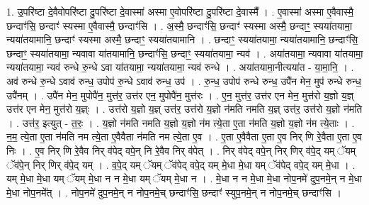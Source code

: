 \documentclass[17pt]{extarticle}
\begin{document}
1. उ॒परि॑ष्टा दे॒वैवोपरि॑ष्टा दु॒परि॑ष्टा दे॒वास्मा॑ अस्मा ए॒वोपरि॑ष्टा दु॒परि॑ष्टा दे॒वास्मै᳚ । . ए॒वास्मा॑ अस्मा ए॒वैवास्मै॒ छन्दाꣳ॑सि॒ छन्दाꣳ॑ स्यस्मा ए॒वैवास्मै॒ छन्दाꣳ॑सि । . अ॒स्मै॒ छन्दाꣳ॑सि॒ छन्दाꣳ॑ स्यस्मा अस्मै॒ छन्दाꣳ॒॒ स्यया॑तयामा॒ न्यया॑तयामानि॒ छन्दाꣳ॑
स्यस्मा अस्मै॒ छन्दाꣳ॒॒ स्यया॑तयामानि । . छन्दाꣳ॒॒ स्यया॑तयामा॒ न्यया॑तयामानि॒ छन्दाꣳ॑सि॒ छन्दाꣳ॒॒ स्यया॑तयामा॒ न्यवावा या॑तयामानि॒ छन्दाꣳ॑सि॒ छन्दाꣳ॒॒ स्यया॑तयामा॒ न्यव॑ । . अया॑तयामा॒ न्यवावा या॑तयामा॒ न्यया॑तयामा॒ न्यव॑ रुन्धे रु॒न्धे ऽवा या॑तयामा॒ न्यया॑तयामा॒ न्यव॑ रुन्धे । . अया॑तयामा॒नीत्यया॑त - या॒मा॒नि॒ । . अव॑ रुन्धे रु॒न्धे ऽवाव॑ रुन्ध॒ उपोप॑ रु॒न्धे ऽवाव॑ रुन्ध॒ उप॑ । . रु॒न्ध॒ उपोप॑ रुन्धे रुन्ध॒ उपै॑न मेन॒ मुप॑ रुन्धे रुन्ध॒ उपै॑नम् । . उपै॑न मेन॒ मुपोपै॑न॒ मुत्त॑र॒ उत्त॑र एन॒ मुपोपै॑न॒ मुत्त॑रः । . ए॒न॒ मुत्त॑र॒ उत्त॑र एन मेन॒ मुत्त॑रो य॒ज्ञो य॒ज्ञ् उत्त॑र एन मेन॒ मुत्त॑रो य॒ज्ञ्ः । . उत्त॑रो य॒ज्ञो य॒ज्ञ् उत्त॑र॒ उत्त॑रो य॒ज्ञो न॑मति नमति य॒ज्ञ् उत्त॑र॒ उत्त॑रो य॒ज्ञो न॑मति । . उत्त॑र॒ इत्युत् - त॒रः॒ । . य॒ज्ञो न॑मति नमति य॒ज्ञो य॒ज्ञो न॑म त्ये॒ता ए॒ता न॑मति य॒ज्ञो य॒ज्ञो न॑म त्ये॒ताः । . न॒म॒ त्ये॒ता ए॒ता न॑मति नम त्ये॒ता ए॒वैवैता न॑मति नम त्ये॒ता ए॒व । . ए॒ता ए॒वैवैता ए॒ता ए॒व निर् णि रे॒वैता ए॒ता ए॒व निः । . ए॒व निर् णि रे॒वैव निर् व॑पेद् वपे॒न् नि रे॒वैव निर् व॑पेत् । . निर् व॑पेद् वपे॒न् निर् णिर् व॑पे॒द् यम् ॅयम् ॅव॑पे॒न् निर् णिर् व॑पे॒द् यम् । . व॒पे॒द् यम् ॅयम् ॅव॑पेद् वपे॒द् यम् मे॒धा मे॒धा यम् ॅव॑पेद् वपे॒द् यम् मे॒धा । . यम् मे॒धा मे॒धा यम् ॅयम् मे॒धा न न मे॒धा यम् ॅयम् मे॒धा न । . मे॒धा न न मे॒धा मे॒धा नोप॒नमे॑ दुप॒नमे॒न् न मे॒धा मे॒धा नोप॒नमे᳚त् । . नोप॒नमे॑ दुप॒नमे॒न् न नोप॒नमे॒च् छन्दाꣳ॑सि॒ छन्दाꣳ॑ स्युप॒नमे॒न् न नोप॒नमे॒च् छन्दाꣳ॑सि । \newline
\end{document}
